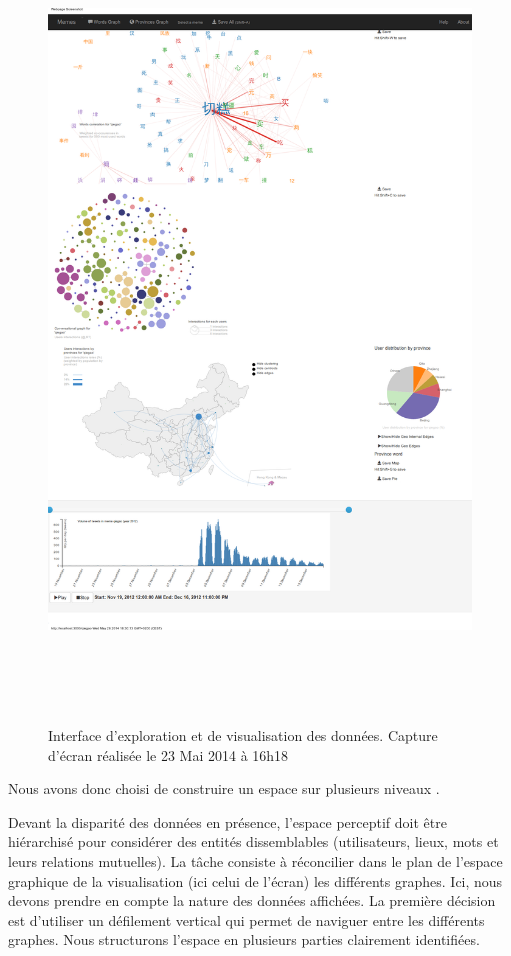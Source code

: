 \begin{figure}
    \centering
    \includegraphics[width=6.7213in,height=8.3894in]{figures/chap4/ui/ui-screenshot.png}
    \caption{Interface d'exploration et de visualisation des données. Capture d’écran réalisée le 23 Mai 2014 à 16h18}
    \label{fig:ui-screenshot}
\end{figure}

Nous avons donc choisi de construire un espace sur plusieurs niveaux .


    Devant la disparité des données en présence, l'espace perceptif doit être hiérarchisé pour considérer des entités dissemblables (utilisateurs, lieux, mots et leurs relations mutuelles). La t\^ache consiste à réconcilier dans le plan de l{\textquoteright}espace graphique de la visualisation (ici celui de l{\textquoteright}écran) les différents graphes. Ici, nous devons prendre en compte la nature des données affichées. La première décision est d'utiliser un défilement vertical qui permet de naviguer entre les différents graphes. Nous structurons l'espace en plusieurs parties clairement identifiées.


